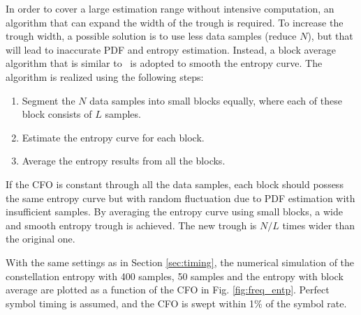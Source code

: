 \documentclass[journal,comsoc, onecolumn, 12pt,draftclsnofoot]{IEEEtran} %
\begin{document}
In order to cover a large estimation range without intensive computation, an algorithm that can expand the width of the trough is required.
To increase the trough width, a possible solution is to use less data samples (reduce \(N\)), but that will lead to inaccurate PDF and entropy estimation.
Instead, a block average algorithm that is similar to~\cite{YuanlingHuang2007} is adopted to smooth the entropy curve. The algorithm is realized using the following steps:

\begin{enumerate}
\item Segment the \(N\) data samples into small blocks equally, where each of these block consists of \(L\) samples. 
\item Estimate the entropy curve for each block.
\item Average the entropy results from all the blocks.
\end{enumerate}
If the CFO is constant through all the data samples, each block should possess the same entropy curve but with random fluctuation due to PDF estimation with insufficient samples.
By averaging the entropy curve using small blocks, a wide and smooth entropy trough is achieved.
The new trough is $N/L$ times wider than the original one.

With the same settings as in Section \ref{sec:timing}, the numerical simulation of the constellation entropy with 400 samples, 50 samples and the entropy with block average are plotted as a function of the CFO in Fig. \ref{fig:freq_entp}.
Perfect symbol timing is assumed, and the CFO is swept within 1\% of the symbol rate.


\end{document}
